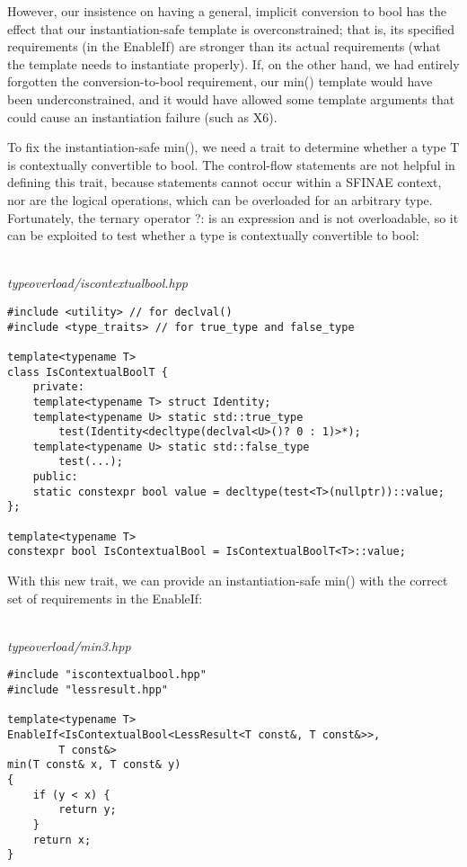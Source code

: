 However, our insistence on having a general, implicit conversion to bool has the effect that our instantiation-safe template is overconstrained; that is, its specified requirements (in the EnableIf) are stronger than its actual requirements (what the template needs to instantiate properly). If, on the other hand, we had entirely forgotten the conversion-to-bool requirement, our min() template would have been underconstrained, and it would have allowed some template arguments that could cause an instantiation failure (such as X6).

To fix the instantiation-safe min(), we need a trait to determine whether a type T is contextually convertible to bool. The control-flow statements are not helpful in defining this trait, because statements cannot occur within a SFINAE context, nor are the logical operations, which can be overloaded for an arbitrary type. Fortunately, the ternary operator ?: is an expression and is not overloadable, so it can be exploited to test whether a type is contextually convertible to bool:

\hspace*{\fill} \\ %
\noindent
\textit{typeoverload/iscontextualbool.hpp}
\begin{lstlisting}[style=styleCXX]
#include <utility> // for declval()
#include <type_traits> // for true_type and false_type

template<typename T>
class IsContextualBoolT {
	private:
	template<typename T> struct Identity;
	template<typename U> static std::true_type
		test(Identity<decltype(declval<U>()? 0 : 1)>*);
	template<typename U> static std::false_type
		test(...);
	public:
	static constexpr bool value = decltype(test<T>(nullptr))::value;
};

template<typename T>
constexpr bool IsContextualBool = IsContextualBoolT<T>::value;
\end{lstlisting}

With this new trait, we can provide an instantiation-safe min() with the correct set of requirements in the EnableIf:

\hspace*{\fill} \\ %
\noindent
\textit{typeoverload/min3.hpp}
\begin{lstlisting}[style=styleCXX]
#include "iscontextualbool.hpp"
#include "lessresult.hpp"

template<typename T>
EnableIf<IsContextualBool<LessResult<T const&, T const&>>,
		T const&>
min(T const& x, T const& y)
{
	if (y < x) {
		return y;
	}
	return x;
}
\end{lstlisting}

